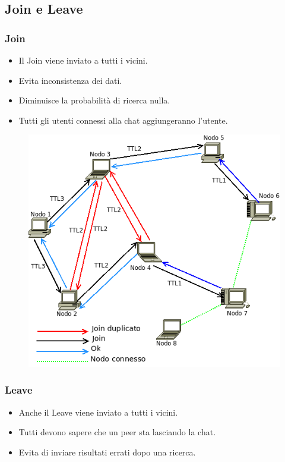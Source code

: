 \documentclass[a4paper,italian,12pt]{beamer}
\begin{document}
		\subsection{Join e Leave}
			\begin{frame}
				\frametitle{Join}
				\begin{itemize}
					\item Il Join viene inviato a tutti i vicini.
					\item Evita inconsistenza dei dati.
					\item Diminuisce la probabilità di ricerca nulla.
					\item Tutti gli utenti connessi alla chat aggiungeranno l'utente.
				\end{itemize}
				\begin{figure}[H]
					\begin{center}
						\includegraphics[scale=0.2]{etc/Join.png}
					\end{center}
				\end{figure}
			\end{frame}
			\begin{frame}
				\frametitle{Leave}
				\begin{itemize}
					\item Anche il Leave viene inviato a tutti i vicini.
					\item Tutti devono sapere che un peer sta lasciando la chat.
					\item Evita di inviare risultati errati dopo una ricerca.
				\end{itemize}
			\end{frame}
	
\end{document}
